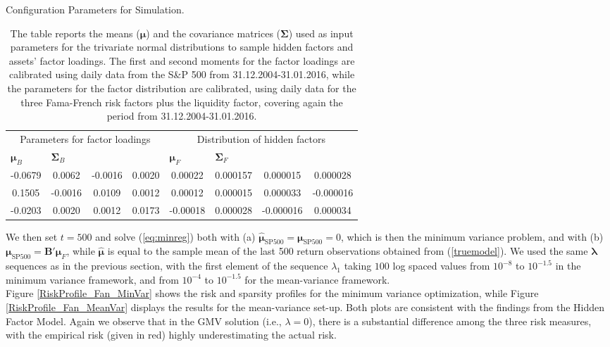 \documentclass[12pt, a4paper]{article}
\newcommand{\bfmu}{\boldsymbol{\mu} }
\newcommand{\bfSigma}{\boldsymbol{\Sigma} }
\newcommand{\bflambda}{\boldsymbol{\lambda}}
\begin{document}
\begin{table}[ht!]
\centering
\caption{Configuration Parameters for \cite{Fan2008} Simulation.}\label{Fan_Calib}
\begin{tabular}{cccccccc}
\hline
\hline
\multicolumn{4}{c}{Parameters for factor loadings} & \multicolumn{4}{c}{Distribution of hidden factors} \\
\cmidrule(lr){1-4}  \cmidrule(lr){5-8}
\multicolumn{1}{l}{$\bfmu_{B}$} & \multicolumn{1}{l}{$\bfSigma_{B}$}& & & \multicolumn{1}{l}{$\bfmu_{F}$} & \multicolumn{1}{l}{$\bfSigma_{F}$}\\
\cmidrule(lr){1-4}  \cmidrule(lr){5-8}
-0.0679& 0.0062  & -0.0016 & 0.0020  & 0.00022 & 0.000157 & 0.000015 & 0.000028\\
0.1505 & -0.0016 & 0.0109  & 0.0012  & 0.00012 & 0.000015 & 0.000033 &-0.000016 \\
-0.0203& 0.0020  & 0.0012  & 0.0173  &-0.00018 & 0.000028 &-0.000016 & 0.000034 \\
\hline
\hline
\end{tabular}
\captionsetup{font=scriptsize,labelfont=scriptsize, width=0.95\textwidth}
     \caption*{The table reports the means ($\bfmu$) and the covariance matrices ($\bfSigma$) used as input parameters for the trivariate normal distributions to sample hidden factors and assets' factor loadings. The first and second moments for the factor loadings are calibrated using daily data from the S\&P 500 from 31.12.2004-31.01.2016, while the parameters for the factor distribution are calibrated, using daily data for the three Fama-French risk factors plus the \cite{Carhart1997} liquidity factor, covering again the period from 31.12.2004-31.01.2016.}
\end{table}
%
We then set $t=500$  and solve (\ref{eq:minreg}) both with (a) $\hat{\bfmu}_{\text{SP500}} = \bfmu_{\text{SP500}} = 0$, which is then the minimum variance problem, and with (b) $\bfmu_{\text{SP500}} = \boldsymbol{B}'\bfmu_{F}$, while $\hat{\bfmu}$ is equal to the sample mean of the last 500 return observations obtained from (\ref{truemodel}). We used the same $\bflambda$ sequences as in the previous section, with the first element of the sequence $\lambda_{1}$ taking  $100$ log spaced values from $10^{-8}$ to $10^{-1.5}$ in the minimum variance framework, and  from $10^{-4}$ to $10^{-1.5}$ for the mean-variance framework.\\
Figure \ref{RiskProfile_Fan_MinVar} shows the risk and sparsity profiles for the minimum variance optimization, while Figure \ref{RiskProfile_Fan_MeanVar} displays the results for the mean-variance set-up. Both plots are consistent with the findings from the Hidden Factor Model. Again we observe that in the GMV solution (i.e., $\lambda = 0$), there is a substantial difference among the three risk measures, with the empirical risk (given in red) highly underestimating the actual risk.
\end{document}
